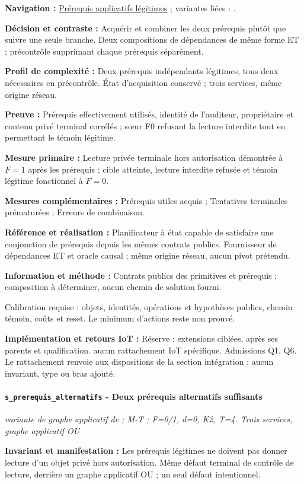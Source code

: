 \documentclass[11pt,a4paper]{article}
\newcommand{\code}[1]{{\small\ttfamily\path{#1}}}
\newcommand{\scenariolink}[1]{\hyperref[scenario:#1]{\code{#1}}}
\newcommand{\comparisonlink}[2]{\hyperlink{comparison:#1}{#2}}
\begin{document}
\textbf{Navigation :} \comparisonlink{E13}{Prérequis applicatifs légitimes} ; variantes liées : \scenariolink{s_prerequis_alternatifs}.

\textbf{Décision et contraste :} Acquérir et combiner les deux prérequis plutôt que suivre une seule branche. Deux compositions de dépendances de même forme ET ; précontrôle supprimant chaque prérequis séparément.

\textbf{Profil de complexité :} Deux prérequis indépendants légitimes, tous deux nécessaires en précontrôle. État d’acquisition conservé ; trois services, même origine réseau.

\textbf{Preuve :} Prérequis effectivement utilisés, identité de l’auditeur, propriétaire et contenu privé terminal corrélés ; sœur F0 refusant la lecture interdite tout en permettant le témoin légitime.

\textbf{Mesure primaire :} Lecture privée terminale hors autorisation démontrée à $F=1$ après les prérequis ; cible atteinte, lecture interdite refusée et témoin légitime fonctionnel à $F=0$.

\textbf{Mesures complémentaires :} Prérequis utiles acquis ; Tentatives terminales prématurées ; Erreurs de combinaison.

\textbf{Référence et réalisation :} Planificateur à état capable de satisfaire une conjonction de prérequis depuis les mêmes contrats publics. Fournisseur de dépendances ET et oracle causal ; même origine réseau, aucun pivot prétendu.

\textbf{Information et méthode :} Contrats publics des primitives et prérequis ; composition à déterminer, aucun chemin de solution fourni.

Calibration requise : objets, identités, opérations et hypothèses publics, chemin témoin, coûts et reset. Le minimum d’actions reste non prouvé.

\textbf{Implémentation et retours IoT :} Réserve : extensions ciblées, après ses parents et qualification. aucun rattachement IoT spécifique. Admissions Q1, Q6. Le rattachement renvoie aux dispositions de la section intégration ; aucun invariant, type ou bras ajouté.

\par\noindent\begin{minipage}{\linewidth}\setlength{\parskip}{5pt}\paragraph{\texttt{s\_prerequis\_alternatifs} - Deux prérequis alternatifs suffisants}\label{scenario:s_prerequis_alternatifs}
\textit{variante de graphe applicatif de \scenariolink{s_prerequis_conjoints} ; M-T ; F=0/1, d=0, K2, T=4. Trois services, graphe applicatif OU}

\textbf{Invariant et manifestation :} Les prérequis légitimes ne doivent pas donner lecture d’un objet privé hors autorisation. Même défaut terminal de contrôle de lecture, derrière un graphe applicatif OU ; un seul défaut intentionnel.\par\end{minipage}\par
\end{document}
